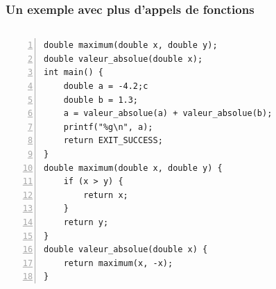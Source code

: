 \documentclass[xcolor=pdftex,svgnames,table]{beamer}
\begin{document}
\begin{frame}[fragile,label=current]
  \frametitle{Un exemple avec plus d'appels de fonctions}
\vspace{-0.5cm}
\begin{columns}
\scriptsize
  \begin{column}[t]{3.7cm}
 \begin{lstlisting}[numbers=left,basicstyle=\ttfamily\scriptsize]
double maximum(double x, double y);
double valeur_absolue(double x);
int main() {
    double a = -4.2;c
    double b = 1.3; 
    a = valeur_absolue(a) + valeur_absolue(b);
    printf("%g\n", a);
    return EXIT_SUCCESS;
}
double maximum(double x, double y) {
    if (x > y) {
        return x;
    }
    return y;
}
double valeur_absolue(double x) {
    return maximum(x, -x);
}
\end{lstlisting}
\vspace{0.5cm}
 \end{column}
\begin{column}[t]{4cm}
\pause~
\end{column}
\end{columns}
\end{frame}
\end{document}
